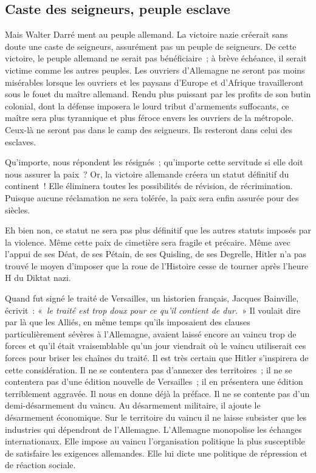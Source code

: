 \documentclass[french,twoside]{book} %
\begin{document}
\subsection[Caste des seigneurs, peuple esclave]{Caste des seigneurs, peuple esclave}
\noindent Mais Walter Darré ment au peuple allemand. La victoire nazie créerait sans doute une caste de seigneurs, assurément pas un peuple de seigneurs. De cette victoire, le peuple allemand ne serait pas bénéficiaire ; à brève échéance, il serait victime comme les autres peuples. Les ouvriers d’Allemagne ne seront pas moins misérables lorsque les ouvriers et les paysans d’Europe et d’Afrique travailleront sous le fouet du maître allemand. Rendu plus puissant par les profits de son butin colonial, dont la défense imposera le lourd tribut d’armements suffocants, ce maître sera plus tyrannique et plus féroce envers les ouvriers de la métropole. Ceux-là ne seront pas dans le camp des seigneurs. Ils resteront dans celui des esclaves.\par
Qu’importe, nous répondent les résignés ; qu’importe cette servitude si elle doit nous assurer la paix ? Or, la victoire allemande créera un statut définitif du continent ! Elle éliminera toutes les possibilités de révision, de récrimination. Puisque aucune réclamation ne sera tolérée, la paix sera enfin assurée pour des siècles.\par
Eh bien non, ce statut ne sera pas plus définitif que les autres statuts imposés par la violence. Même cette paix de cimetière sera fragile et précaire. Même avec l’appui de ses Déat, de ses Pétain, de ses Quisling, de ses Degrelle, Hitler n’a pas trouvé le moyen d’imposer que la roue de l’Histoire cesse de tourner après l’heure H du Diktat nazi.\par
Quand fut signé le traité de Versailles, un historien français, Jacques Bainville, écrivit : « \emph{le traité est trop doux pour ce qu’il contient de dur.} » Il voulait dire par là que les Alliés, en même temps qu’ils imposaient des clauses particulièrement sévères à l’Allemagne, avaient laissé encore au vaincu trop de forces et qu’il était vraisemblable qu’un jour viendrait où le vaincu utiliserait ces forces pour briser les chaînes du traité. Il est très certain que Hitler s’inspirera de cette considération. Il ne se contentera pas d’annexer des territoires ; il ne se contentera pas d’une édition nouvelle de Versailles ; il en présentera une édition terriblement aggravée. Il nous en donne déjà la préface. Il ne se contente pas d’un demi-désarmement du vaincu. Au désarmement militaire, il ajoute le désarmement économique. Sur le territoire du vaincu il ne laisse subsister que les industries qui dépendront de l’Allemagne. L’Allemagne monopolise les échanges internationaux. Elle impose au vaincu l’organisation politique la plus susceptible de satisfaire les exigences allemandes. Elle lui dicte une politique de répression et de réaction sociale.
\end{document}
